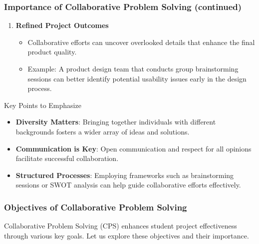 \documentclass{beamer}
\begin{document}
\begin{frame}[fragile]
    \frametitle{Importance of Collaborative Problem Solving (continued)}
    \begin{enumerate}[resume]
        \item \textbf{Refined Project Outcomes}
            \begin{itemize}
                \item Collaborative efforts can uncover overlooked details that enhance the final product quality.
                \item Example: A product design team that conducts group brainstorming sessions can better identify potential usability issues early in the design process.
            \end{itemize}
    \end{enumerate}
    
    \begin{block}{Key Points to Emphasize}
        \begin{itemize}
            \item \textbf{Diversity Matters}: Bringing together individuals with different backgrounds fosters a wider array of ideas and solutions.
            \item \textbf{Communication is Key}: Open communication and respect for all opinions facilitate successful collaboration.
            \item \textbf{Structured Processes}: Employing frameworks such as brainstorming sessions or SWOT analysis can help guide collaborative efforts effectively.
        \end{itemize}
    \end{block}
\end{frame}

\begin{frame}[fragile]
    \frametitle{Objectives of Collaborative Problem Solving}
    Collaborative Problem Solving (CPS) enhances student project effectiveness through various key goals. Let us explore these objectives and their importance.
\end{frame}
\end{document}
